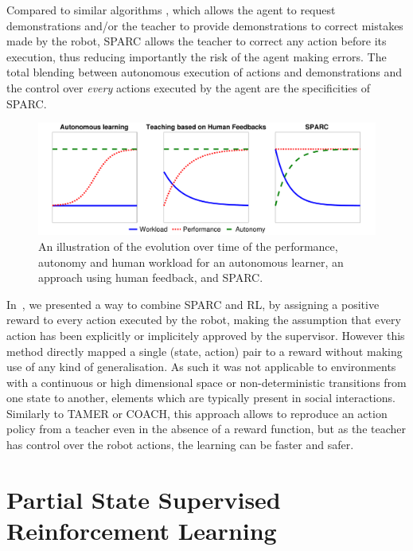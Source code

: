 \documentclass[letterpaper]{article} %
\begin{document}
Compared to similar algorithms
\cite{chernova2009interactive,walsh2010generalizing}, which allows the agent to
request demonstrations and/or the teacher to provide demonstrations to correct
mistakes made by the robot, SPARC allows the teacher to correct any action
before its execution, thus reducing importantly the risk of the agent making
errors. The total blending between autonomous execution of actions and
demonstrations and the control over \emph{every} actions executed by the agent
are the specificities of SPARC.

\begin{figure}
    \centering
    \includegraphics[width=0.9\linewidth]{./figs/motivation.pdf}
    \caption{An illustration of the evolution over time of the performance,
    autonomy and human workload for an autonomous learner, an approach using
    human feedback, and SPARC.}
    \label{fig:comparison}
\end{figure}

In~\cite{senft2017supervised}, we presented a way to combine SPARC and RL, by
assigning a positive reward to every action executed by the robot, making the
assumption that every action has been explicitly or implicitely approved by the
supervisor. However this method directly mapped a single (state, action)
pair to a reward without making use of any kind of generalisation. As such it
was not applicable to environments with a continuous or high dimensional space
or non-deterministic transitions from one state to another, elements which are
typically present in social interactions. Similarly to TAMER or COACH, this
approach allows to reproduce an action policy from a teacher even in the absence
of a reward function, but as the teacher has control over the robot actions, the
learning can be faster and safer.

\section{Partial State Supervised Reinforcement Learning}
\end{document}
